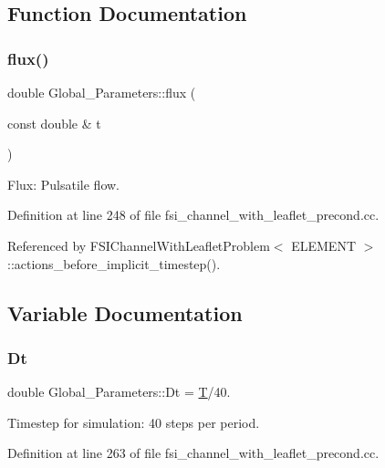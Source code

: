 \subsection{Function Documentation}
\mbox{\label{namespaceGlobal__Parameters_a536aa5314a6cdb36af852e9513351d55}} 
\subsubsection{\texorpdfstring{flux()}{flux()}}
{\footnotesize\ttfamily double Global\+\_\+\+Parameters\+::flux (\begin{DoxyParamCaption}\item[{const double \&}]{t }\end{DoxyParamCaption})}



Flux\+: Pulsatile flow. 



Definition at line 248 of file fsi\+\_\+channel\+\_\+with\+\_\+leaflet\+\_\+precond.\+cc.



Referenced by F\+S\+I\+Channel\+With\+Leaflet\+Problem$<$ E\+L\+E\+M\+E\+N\+T $>$\+::actions\+\_\+before\+\_\+implicit\+\_\+timestep().



\subsection{Variable Documentation}
\mbox{\label{namespaceGlobal__Parameters_ab29c9f716872de235c78e62bce2c4109}} 
\subsubsection{\texorpdfstring{Dt}{Dt}}
{\footnotesize\ttfamily double Global\+\_\+\+Parameters\+::\+Dt = \hyperlink{namespaceGlobal__Parameters_aeb964d25d190afd43c8317d4217f31b4}{T}/40.}



Timestep for simulation\+: 40 steps per period. 



Definition at line 263 of file fsi\+\_\+channel\+\_\+with\+\_\+leaflet\+\_\+precond.\+cc.



